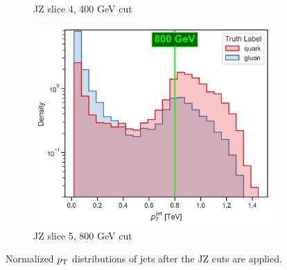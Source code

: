 \begin{figure}[!htb]
\begin{subfigure}[t]{0.49\textwidth}
        \caption{JZ slice 4, 400 GeV cut}
        \label{fig:jz_separete_4}
    \end{subfigure}
    \begin{subfigure}[t]{0.49\textwidth}
        \centering
        \includegraphics[width=\linewidth]{src/plots/pt_jet_label_5.jpg}
        \caption{JZ slice 5, 800 GeV cut}
        \label{fig:jz_separete_5}
    \end{subfigure}
    \caption{Normalized $p_\text{T}$ distributions of jets after the JZ cuts are applied.}
    \label{fig:jz_separete}
\end{figure}

